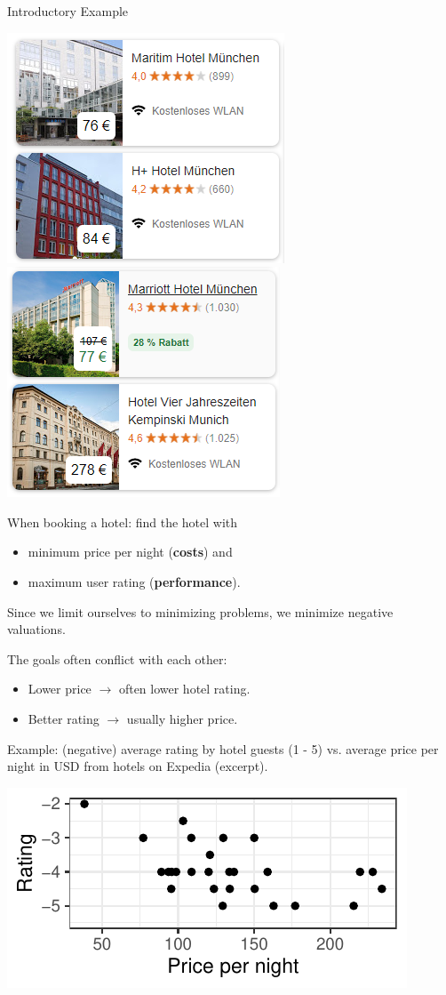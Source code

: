 \begin{frame}[allowframebreaks]{Introductory Example}
\begin{center}
\includegraphics[width = 0.35\linewidth]{images/booking1.png} ~~~ \includegraphics[width = 0.35\linewidth]{images/booking2.png}
\end{center}

When booking a hotel: find the hotel with

\begin{itemize}
\item minimum price per night (\textbf{costs}) and
\item maximum user rating (\textbf{performance}).
\end{itemize}

\vfill

\begin{footnotesize}
Since we limit ourselves to minimizing problems, we minimize negative valuations.
\end{footnotesize}

\framebreak

The goals often conflict with each other:

\begin{itemize}
\item Lower price $\to$ often lower hotel rating.
\item Better rating $\to$ usually higher price.
\end{itemize}

Example: (negative) average rating by hotel guests (1 - 5) vs. average price per night in USD from hotels on Expedia (excerpt).

\vspace*{0.2cm}

\centering \includegraphics[scale=1]{images/expedia-1-1}



\end{frame}
